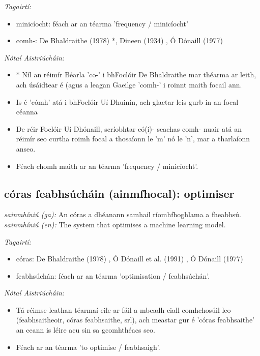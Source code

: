 \documentclass{article}
\begin{document}
 \noindent \textit{Tagairtí:}
\begin{itemize}
	\item minicíocht: féach ar an téarma 'frequency / minicíocht'
	\item comh-: De Bhaldraithe (1978) \cite{de-bhaldraithe}*, Dineen (1934) \cite{dineen}, Ó Dónaill (1977) \cite{odonaill}
\end{itemize}

 \noindent \textit{Nótaí Aistriúcháin:}
\begin{itemize}
	\item * Níl an réimír Béarla 'co-' i bhFoclóir De Bhaldraithe mar théarma ar leith, ach úsáidtear é (agus a leagan Gaeilge 'comh-' i roinnt maith focail ann.
	\item Is é 'cómh' atá i bhFoclóir Uí Dhuinín, ach glactar leis gurb in an focal céanna
	\item De réir Foclóir Uí Dhónaill, scríobhtar có(i)- seachas comh- nuair atá an réimír seo curtha roimh focal a thosaíonn le 'm' nó le 'n', mar a tharlaíonn anseo.
	\item Féach chomh maith ar an téarma 'frequency / minicíocht'.
\end{itemize}


\subsection*{córas feabhsúcháin (ainmfhocal): optimiser} 
 \noindent \textit{sainmhíniú (ga):} An córas a dhéanann samhail ríomhfhoghlama a fheabhsú.
\newline\newline
 \noindent \textit{sainmhíniú (en):} The system that optimises a machine learning model.
\newline

 \noindent \textit{Tagairtí:}
\begin{itemize}
	\item córas: De Bhaldraithe (1978) \cite{de-bhaldraithe}, Ó Dónaill et al. (1991) \cite{focloir-beag}, Ó Dónaill (1977) \cite{odonaill}
	\item feabhsúchán: féach ar an téarma 'optimisation / feabhsúchán'.
\end{itemize}

 \noindent \textit{Nótaí Aistriúcháin:}
\begin{itemize}
	\item Tá réimse leathan téarmaí eile ar fáil a mbeadh ciall comhchosúil leo (feabhsaitheoir, córas feabhsaithe, srl), ach meastar gur é 'córas feabhsaithe' an ceann is léire acu sin sa gcomhthéacs seo.
	\item Féach ar an téarma 'to optimise / feabhsaigh'.
\end{itemize}
\end{document}
